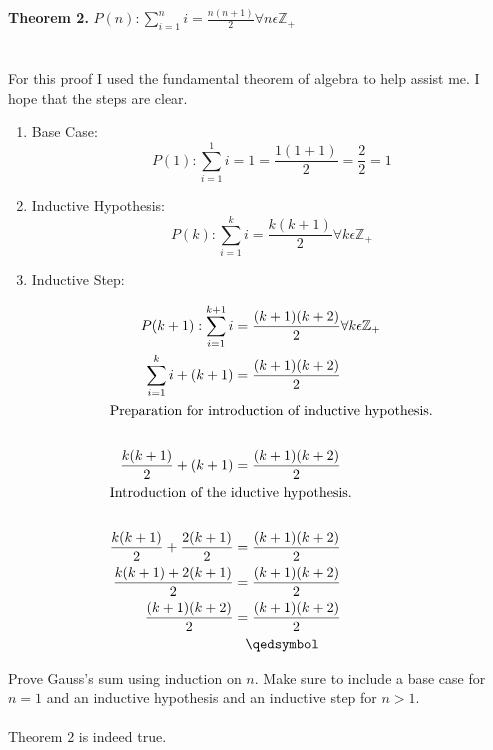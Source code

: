 \documentclass[12pt]{article}
\begin{document}
\noindent \textbf{Theorem 2.}
\begin{math}P(n):\sum\limits_{i = 1}^{n} i = \frac{n(n + 1)}{2} \forall n \epsilon \mathbb{Z}_+  \end{math}\\
\\\\For this proof I used the fundamental theorem of algebra to help assist me. I hope that the steps are clear.\\
\begin{enumerate}
\item Base Case:\\
\[P(1):\sum\limits_{i = 1}^{1} i = 1  = \frac{1(1+1)}{2} = \frac{2}{2} = 1\]
\item Inductive Hypothesis:
\[P(k):\sum\limits_{i = 1}^{k} i = \frac{k(k + 1)}{2} \forall k \epsilon \mathbb{Z}_+\]
\item Inductive Step:

\begin{align*}
P(k+1):\sum\limits_{i = 1}^{k+1} i &= \frac{(k + 1)(k+2)}{2} \forall k \epsilon \mathbb{Z}_+\\
\sum\limits_{i = 1}^{k} i + (k + 1)&= \frac{(k + 1)(k+2)}{2}\\
\intertext{Preparation for introduction of inductive hypothesis.}\\
\frac{k(k+1)}{2} + (k+1)&= \frac{(k + 1)(k+2)}{2}\\
\intertext{Introduction of the iductive hypothesis.}\\
\frac{k(k+1)}{2} + \frac{2(k+1)}{2}&= \frac{(k + 1)(k+2)}{2}\\
\frac{k(k+1)+ 2(k+1)}{2}&= \frac{(k + 1)(k+2)}{2}\\
\frac{(k + 1)(k+2)}{2}&= \frac{(k + 1)(k+2)}{2}\\
&\hspace{0.3cm}\qedsymbol
\end{align*}
\end{enumerate}
\noindent Prove Gauss’s sum using induction on \begin{math}n\end{math}. Make sure to include a base case for \begin{math} n = 1\end{math} and an inductive hypothesis and an inductive step for \begin{math}n > 1\end{math}.\\\\
\noindent Theorem 2 is indeed true.\\\\
\end{document}
